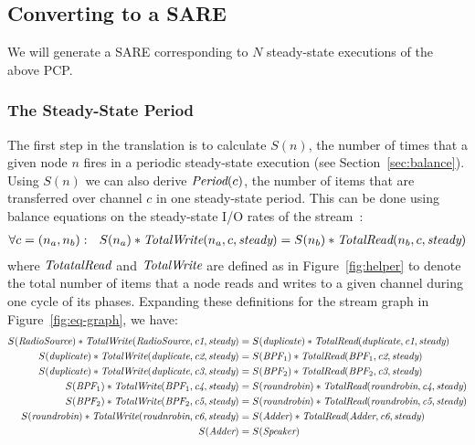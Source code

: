 \subsection{Converting to a SARE}

We will generate a SARE corresponding to $N$ steady-state executions
of the above PCP.

\subsubsection{The Steady-State Period}

The first step in the translation is to calculate $S(n)$, the number
of times that a given node $n$ fires in a periodic steady-state
execution (see Section~\ref{sec:balance}).  Using $S(n)$ we can also
derive $\mbox{\it Period}(c)$, the number of items that are transferred over
channel $c$ in one steady-state period.  This can be done using
balance equations on the steady-state I/O rates of the
stream~\cite{leesdf}:
\begin{align*}
\forall c = (n_a, n_b):~~S(n_a) * \mbox{\it TotalWrite}(n_a, c, \mbox{\it steady}) 
  = S(n_b) * \mbox{\it TotalRead}(n_b, c, \mbox{\it steady})
\end{align*}
where $\mbox{\it TotatalRead}$ and $\mbox{\it TotalWrite}$ are defined as in
Figure~\ref{fig:helper} to denote the total number of items that a
node reads and writes to a given channel during one cycle of its
phases.  Expanding these definitions for the stream graph in
Figure~\ref{fig:eq-graph}, we have:
\begin{align*}
S(\mbox{\it RadioSource}) * \mbox{\it TotalWrite}(\mbox{\it RadioSource}, \mbox{\it c1}, \mbox{\it steady}) 
  &= S(\mbox{\it duplicate}) * \mbox{\it TotalRead}(\mbox{\it duplicate}, \mbox{\it c1}, \mbox{\it steady}) \\
S(\mbox{\it duplicate}) * \mbox{\it TotalWrite}(\mbox{\it duplicate}, \mbox{\it c2}, \mbox{\it steady}) 
  &= S(\mbox{\it BPF}_1) * \mbox{\it TotalRead}(\mbox{\it BPF}_1, \mbox{\it c2}, \mbox{\it steady}) \\
S(\mbox{\it duplicate}) * \mbox{\it TotalWrite}(\mbox{\it duplicate}, \mbox{\it c3}, \mbox{\it steady})
  &= S(\mbox{\it BPF}_2) * \mbox{\it TotalRead}(\mbox{\it BPF}_2, \mbox{\it c3}, \mbox{\it steady}) \\
S(\mbox{\it BPF}_1) * \mbox{\it TotalWrite}(\mbox{\it BPF}_1, \mbox{\it c4}, \mbox{\it steady}) 
  &= S(\mbox{\it roundrobin}) * \mbox{\it TotalRead}(\mbox{\it roundrobin}, \mbox{\it c4}, \mbox{\it steady}) \\
S(\mbox{\it BPF}_2) * \mbox{\it TotalWrite}(\mbox{\it BPF}_2, \mbox{\it c5}, \mbox{\it steady}) 
  &= S(\mbox{\it roundrobin}) * \mbox{\it TotalRead}(\mbox{\it roundrobin}, \mbox{\it c5}, \mbox{\it steady}) \\
S(\mbox{\it roundrobin}) * \mbox{\it TotalWrite}(\mbox{\it roudnrobin}, \mbox{\it c6}, \mbox{\it steady})
  &= S(\mbox{\it Adder}) * \mbox{\it TotalRead}(\mbox{\it Adder}, \mbox{\it c6}, \mbox{\it steady}) \\
S(\mbox{\it Adder}) 
  &= S(\mbox{\it Speaker})
\end{align*}
